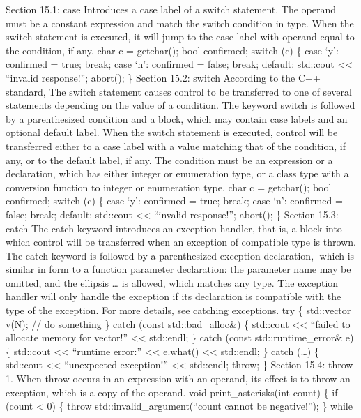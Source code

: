 Section 15.1: case Introduces a case label of a switch statement. The
operand must be a constant expression and match the switch condition in
type. When the switch statement is executed, it will jump to the case
label with operand equal to the condition, if any. char c = getchar();
bool confirmed; switch (c) \{ case `y': confirmed = true; break; case
`n': confirmed = false; break; default: std::cout \textless\textless{}
``invalid response!\n''; abort(); \} Section 15.2: switch According to
the C++ standard, The switch statement causes control to be transferred
to one of several statements depending on the value of a condition. The
keyword switch is followed by a parenthesized condition and a block,
which may contain case labels and an optional default label. When the
switch statement is executed, control will be transferred either to a
case label with a value matching that of the condition, if any, or to
the default label, if any. The condition must be an expression or a
declaration, which has either integer or enumeration type, or a class
type with a conversion function to integer or enumeration type. char c =
getchar(); bool confirmed; switch (c) \{ case `y': confirmed = true;
break; case `n': confirmed = false; break; default: std::cout
\textless\textless{} ``invalid response!\n''; abort(); \} Section 15.3:
catch The catch keyword introduces an exception handler, that is, a
block into which control will be transferred when an exception of
compatible type is thrown. The catch keyword is followed by a
parenthesized exception declaration, which is similar in form to a
function parameter declaration: the parameter name may be omitted, and
the ellipsis \ldots{} is allowed, which matches any type. The exception
handler will only handle the exception if its declaration is compatible
with the type of the exception. For more details, see catching
exceptions. try \{ std::vector v(N); // do something \} catch (const
std::bad\_alloc\&) \{ std::cout \textless\textless{} ``failed to
allocate memory for vector!'' \textless\textless{} std::endl; \} catch
(const std::runtime\_error\& e) \{ std::cout \textless\textless{}
``runtime error:'' \textless\textless{} e.what() \textless\textless{}
std::endl; \} catch (\ldots) \{ std::cout \textless\textless{}
``unexpected exception!'' \textless\textless{} std::endl; throw; \}
Section 15.4: throw 1. When throw occurs in an expression with an
operand, its eﬀect is to throw an exception, which is a copy of the
operand. void print\_asterisks(int count) \{ if (count \textless{} 0) \{
throw std::invalid\_argument(``count cannot be negative!''); \} while
